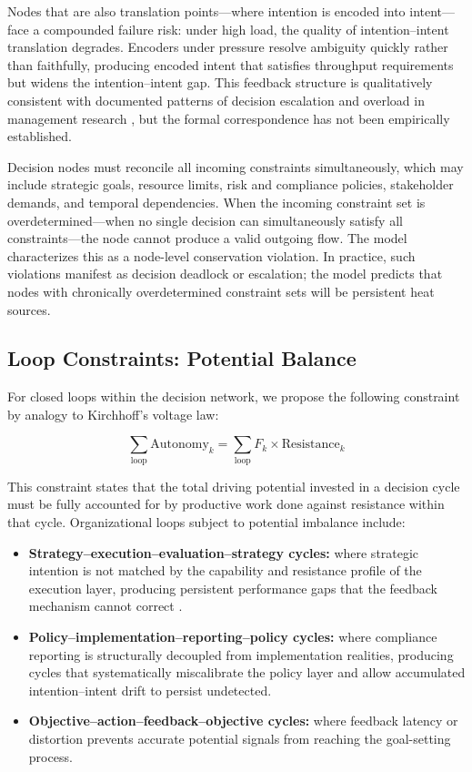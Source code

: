 \documentclass[12pt]{article}
\begin{document}
Nodes that are also translation points---where intention is encoded into
intent---face a compounded failure risk: under high load, the quality of
intention--intent translation degrades. Encoders under pressure resolve
ambiguity quickly rather than faithfully, producing encoded intent that
satisfies throughput requirements but widens the intention--intent gap.
This feedback structure is qualitatively consistent with documented patterns
of decision escalation and overload in management research
\citep{sterman1989modeling}, but the formal correspondence has not been
empirically established.

Decision nodes must reconcile all incoming constraints simultaneously,
which may include strategic goals, resource limits, risk and compliance
policies, stakeholder demands, and temporal dependencies. When the
incoming constraint set is overdetermined---when no single decision can
simultaneously satisfy all constraints---the node cannot produce a valid
outgoing flow. The model characterizes this as a node-level conservation
violation. In practice, such violations manifest as decision deadlock or
escalation; the model predicts that nodes with chronically overdetermined
constraint sets will be persistent heat sources.

\subsection{Loop Constraints: Potential Balance}

For closed loops within the decision network, we propose the following
constraint by analogy to Kirchhoff's voltage law:

\[
\sum_{\text{loop}} \text{Autonomy}_k = \sum_{\text{loop}} F_k \times \text{Resistance}_k
\]

This constraint states that the total driving potential invested in a
decision cycle must be fully accounted for by productive work done against
resistance within that cycle. Organizational loops subject to potential
imbalance include:

\begin{itemize}
  \item \textbf{Strategy--execution--evaluation--strategy cycles:}
    where strategic intention is not matched by the capability and resistance
    profile of the execution layer, producing persistent performance gaps
    that the feedback mechanism cannot correct \citep{sterman1989modeling}.
  \item \textbf{Policy--implementation--reporting--policy cycles:}
    where compliance reporting is structurally decoupled from implementation
    realities, producing cycles that systematically miscalibrate the
    policy layer and allow accumulated intention--intent drift to persist
    undetected.
  \item \textbf{Objective--action--feedback--objective cycles:}
    where feedback latency or distortion prevents accurate potential signals
    from reaching the goal-setting process.
\end{itemize}
\end{document}
